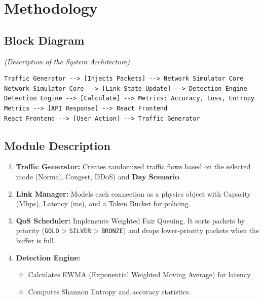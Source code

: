 \documentclass[12pt]{report}
\begin{document}
\chapter{Methodology}

\section{Block Diagram}
\textit{(Description of the System Architecture)}
\begin{verbatim}
Traffic Generator --> [Injects Packets] --> Network Simulator Core
Network Simulator Core --> [Link State Update] --> Detection Engine
Detection Engine --> [Calculate] --> Metrics: Accuracy, Loss, Entropy
Metrics --> [API Response] --> React Frontend
React Frontend --> [User Action] --> Traffic Generator
\end{verbatim}

\section{Module Description}
\begin{enumerate}
    \item \textbf{Traffic Generator:} Creates randomized traffic flows based on the selected mode (Normal, Congest, DDoS) and \textbf{Day Scenario}.
    \item \textbf{Link Manager:} Models each connection as a physics object with Capacity (Mbps), Latency (ms), and a Token Bucket for policing.
    \item \textbf{QoS Scheduler:} Implements Weighted Fair Queuing. It sorts packets by priority (\texttt{GOLD} > \texttt{SILVER} > \texttt{BRONZE}) and drops lower-priority packets when the buffer is full.
    \item \textbf{Detection Engine:}
    \begin{itemize}
        \item Calculates EWMA (Exponential Weighted Moving Average) for latency.
        \item Computes Shannon Entropy and accuracy statistics.
    \end{itemize}
\end{enumerate}
\end{document}
